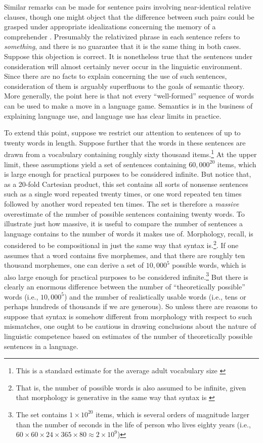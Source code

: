 Similar remarks can be made for sentence pairs involving near-identical relative clauses, though one might object that the difference between such pairs could be grasped under appropriate idealizations concerning the memory of a comprehender \citep{FodorPylyshyn:1988}. Presumably the relativized phrase in each sentence refers to \textit{something}, and there is no guarantee that it is the same thing in both cases. Suppose this objection is correct. It is nonetheless true that the sentences under consideration will almost certainly never occur in the linguistic environment. Since there are no facts to explain concerning the use of such sentences, consideration of them is arguably superfluous to the goals of semantic theory. More generally, the point here is that not every ``well-formed'' sequence of words can be used to make a move in a language game. Semantics is in the business of explaining language use, and language use has clear limits in practice.

To extend this point, suppose we restrict our attention to sentences of up to twenty words in length. Suppose further that the words in these sentences are drawn from a vocabulary containing roughly sixty thousand items.\footnote{This is a standard estimate for the average adult vocabulary size \citep{Pinker:1994,Harley:2014}} At the upper limit, these assumptions yield a set of sentences containing $60,000^{20}$ items, which is large enough for practical purposes to be considered infinite. But notice that, as a 20-fold Cartesian product, this set contains all sorts of nonsense sentences such as a single word repeated twenty times, or one word repeated ten times followed by another word repeated ten times. The set is therefore a \textit{massive} overestimate of the number of possible sentences containing twenty words. To illustrate just how massive, it is useful to compare the number of sentences a language contains to the number of words it makes use of. Morphology, recall, is considered to be compositional in just the same way that syntax is.\footnote{That is, the number of possible words is also assumed to be infinite, given that morphology is generative in the same way that syntax is \citep{Pinker:1994}}. If one assumes that a word contains five morphemes, and that there are roughly ten thousand morphemes, one can derive a set of $10,000^{5}$ possible words, which is also large enough for practical purposes to be considered infinite.\footnote{The set contains $1 \times 10^{20}$ items, which is several orders of magnitude larger than the number of seconds in the life of person who lives eighty years (i.e., $60 \times 60 \times 24 \times 365 \times 80 \approx 2 \times 10^{9}$)} But there is clearly an enormous difference between the number of ``theoretically possible'' words (i.e., $10,000^{5}$) and the number of realistically usable words (i.e., tens or perhaps hundreds of thousands if we are generous). So unless there are reasons to suppose that syntax is somehow different from morphology with respect to such mismatches, one ought to be cautious in drawing conclusions about the nature of linguistic competence based on estimates of the number of theoretically possible sentences in a language.

